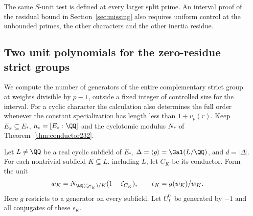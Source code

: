 \documentclass[a4paper,11pt]{article}
\theoremstyle{definition}
\theoremstyle{remark}
\numberwithin{equation}{section}
\begin{document}
The same \(S\)-unit test is defined at every larger split prime.
An interval proof of the residual bound in
Section~\ref{sec:missing} also requires uniform control at
the unbounded primes, the other characters and the other
inertia residue.


\subsection{Two unit polynomials for the zero-residue strict groups}
\label{sec:unitpolys523}

We compute the number of generators of the entire complementary
strict group at weights divisible by \(p-1\), outside a fixed
integer of controlled size for the interval. For a cyclic character
the calculation also determines the full order whenever the
constant specialization has length less than \(1+v_p(r)\).
Keep \(E_x\subseteq E_*\), \(n_*=[E_*:\QQ]\) and the cyclotomic
modulus \(N_*\) of Theorem~\ref{thm:conductor232}.

Let \(L\ne\QQ\) be a real cyclic subfield of \(E_*\),
\(\Delta=\langle g\rangle=\Gal(L/\QQ)\), and \(d=|\Delta|\).
For each nontrivial subfield \(K\subseteq L\), including \(L\), let
\(C_K\) be its conductor. Form the unit
\[
  w_K=N_{\QQ(\zeta_{C_K})/K}(1-\zeta_{C_K}),\qquad
  \epsilon_K=g(w_K)/w_K .
\]
Here \(g\) restricts to a generator on every subfield. Let \(U_L^0\)
be generated by \(-1\) and all conjugates of these \(\epsilon_K\).
\end{document}
